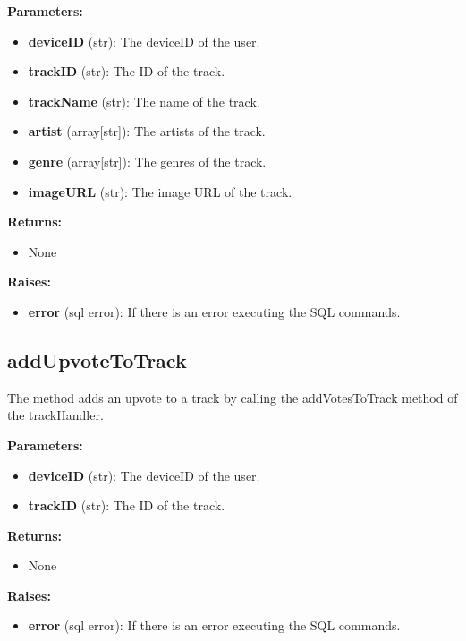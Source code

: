 \documentclass[oneside, nenglish]{sdqtechreport}
\begin{document}
\begin{itemize}
\textbf{Parameters:}

\begin{itemize}
    \item \textbf{deviceID} (str): The deviceID of the user.
    \item \textbf{trackID} (str): The ID of the track.
    \item \textbf{trackName} (str): The name of the track.
    \item \textbf{artist} (array[str]): The artists of the track.
    \item \textbf{genre} (array[str]): The genres of the track.
    \item \textbf{imageURL} (str): The image URL of the track.
\end{itemize}

\textbf{Returns:}

\begin{itemize}
    \item None
\end{itemize}

\textbf{Raises:}

\begin{itemize}
    \item \textbf{error} (sql error): If there is an error executing the SQL commands.
\end{itemize}


\subsection{addUpvoteToTrack}

The method adds an upvote to a track by calling the addVotesToTrack method of the trackHandler.

\textbf{Parameters:}

\begin{itemize}
    \item \textbf{deviceID} (str): The deviceID of the user.
    \item \textbf{trackID} (str): The ID of the track.
\end{itemize}

\textbf{Returns:}

\begin{itemize}
    \item None
\end{itemize}

\textbf{Raises:}

\begin{itemize}
    \item \textbf{error} (sql error): If there is an error executing the SQL commands.
\end{itemize}



\end{itemize}
\end{document}
